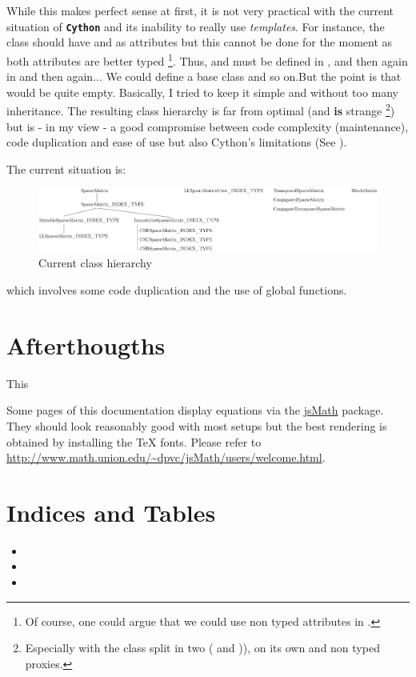 \documentclass[letterpaper,10pt,english]{sphinxmanual}
\begin{document}
While this makes perfect sense at first, it is not very practical with the current situation of \textbf{\texttt{Cython}} and its inability to really use \emph{templates}. For instance, the  class should have
 and  as attributes but this cannot be done for the moment as both attributes are better typed \footnote{
Of course, one could argue that we could use non typed attributes in .
}. Thus,  and  must be defined in , and then
again in  and then again... We could define a base  class and so on.But the point is that  would be quite empty. Basically, I tried to keep it simple and
without too many inheritance. The resulting class hierarchy is far from optimal (and \textbf{is} strange \footnote{
Especially with the  class split in two ( and )),  on its own and
non typed proxies.
}) but is - in my view - a good compromise between code complexity (maintenance), code
duplication and ease of use but also Cython's limitations (See \footnotemark[1]).

The current situation is:
\begin{figure}[htbp]
\centering
\capstart

\includegraphics[width=700pt]{current_class_hierarchy.pdf}
\caption{Current class hierarchy}\end{figure}

which involves some code duplication and the use of global functions.


\chapter{Afterthougths}
\label{afterthougths::doc}\label{afterthougths:afterthougths}\label{afterthougths:id1}
This

Some pages of this documentation display equations via the \href{http://www.math.union.edu/~dpvc/jsMath/welcome.html}{jsMath} package. They should
look reasonably good with most setups but the best rendering is obtained by
installing the TeX fonts. Please refer to
\href{http://www.math.union.edu/~dpvc/jsMath/users/welcome.html}{http://www.math.union.edu/\textasciitilde{}dpvc/jsMath/users/welcome.html}.


\chapter{Indices and Tables}
\label{contents:indices-and-tables}\begin{itemize}
\item {} 

\item {} 

\item {} 

\end{itemize}



\renewcommand{\indexname}{Index}
\printindex
\end{document}
